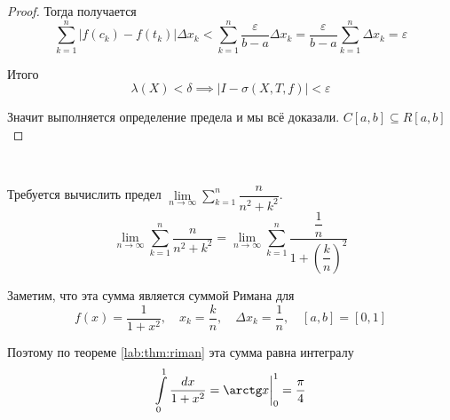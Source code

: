 \documentclass[../main.tex]{subfiles}
\begin{document}
\begin{proof}
    Тогда получается 
    \[ \sum\limits_{ k=1}^{ n} \left| f\left( c_k\right)-f\left( t_k\right)\right| \Delta x_k < \sum\limits_{ k=1}^{ n} \dfrac{ \varepsilon}{ b-a} \Delta x_k= \dfrac{ \varepsilon}{ b-a} \sum\limits_{ k=1}^{ n} \Delta x_k= \varepsilon \]

    Итого 
    \[ \lambda \left( X\right) < \delta \implies \left| I-\sigma\left( X,T,f\right)\right| < \varepsilon \]

    Значит выполняется определение предела и мы всё доказали. \( C\left[ a,b\right] \subseteq R \left[ a,b\right]\)
\end{proof}

\begin{example}
    
    ~

    Требуется вычислить предел \( \lim\limits_{ n\rightarrow \infty } \sum\limits_{ k=1}^{ n} \dfrac{ n}{ n^2+k^2}\). 
    \[ \lim\limits_{ n\rightarrow \infty } \sum\limits_{ k=1}^{ n} \dfrac{ n}{ n^2+k^2}=\lim\limits_{ n\rightarrow \infty } \sum\limits_{ k=1}^{ n} \dfrac{ \dfrac{ 1}{ n} }{ 1+ \left(\dfrac{ k}{ n} \right)^2}\]

    Заметим, что эта сумма является суммой Римана для 
    \[ f\left( x\right)= \dfrac{ 1}{ 1+x^2} ,\quad x_k= \dfrac{ k}{ n} ,\quad \Delta x_k= \dfrac{ 1}{ n} ,\quad \left[ a,b\right]=\left[ 0,1\right]\] 
    
    Поэтому по теореме \ref{lab:thm:riman} эта сумма равна интегралу 
    \[ \displaystyle\int\limits_{ 0}^{ 1} \dfrac{ dx}{ 1+x^2} = \arctg x \bigg|_0^1 = \dfrac{ \pi}{ 4} \]
\end{example}
\end{document}
